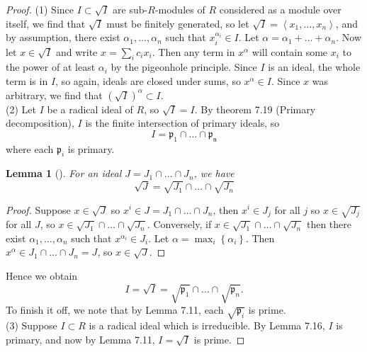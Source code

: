 \documentclass[reqno]{amsart}
\newtheorem{lemma}[theorem]{Lemma}
\theoremstyle{definition}
\theoremstyle{remark}
\begin{document}
    \begin{proof}
        (1) Since $I \subset \sqrt{I} $ are
        sub-$R$-modules of $R$ considered as a module
        over itself, we find that
        $\sqrt{I} $ must be finitely generated, so let
        $\sqrt{I}  = \left< x_1, \ldots, x_n \right>$, and
        by assumption,
        there exist $\alpha_1, \ldots, \alpha_n$ such that
        $x_i^{\alpha_i} \in I$.
        Let $\alpha = \alpha_1 + \ldots
        + \alpha_n$.
        Now let
        $x \in \sqrt{I} $ and write
        $x = \sum_{i} c_i x_i$. Then
        any term in
        $x^{\alpha}$ will contain some
        $x_i$ to the power of at
        least $\alpha_i$ by
        the pigeonhole principle. Since
        $I$ is an ideal, the whole term is in $I$, so
        again, ideals are closed under sums, so
         $x^{\alpha} \in I$.
         Since $x$ was arbitrary, we find
         that
         $\left( \sqrt{I}  \right)^{\alpha}
         \subset I$.\\
         \linebreak
         (2) Let
         $I$ be a radical ideal of $R$, so
         $\sqrt{I}  = I$.
         By theorem 7.19 (Primary decomposition),
         $I$ is the finite intersection
         of primary ideals, so
         \[
         I = \mathfrak{p}_1 \cap \ldots
         \cap \mathfrak{p_n}
         \]
         where each $\mathfrak{p}_i$ is primary.

         \begin{lemma}[]
             For an ideal $J =
             J_1 \cap \ldots \cap J_n$, we have
             \[
             \sqrt{J}  = \sqrt{J_1}  \cap
             \ldots \cap \sqrt{J_n}
             \]
         \end{lemma}
         \begin{proof}
             Suppose
             $x \in \sqrt{J} $ so
             $x^{i} \in J =
             J_1 \cap \ldots \cap J_n$, then
             $x^{i} \in J_j$ for all $j$ so
             $x \in \sqrt{J_j} $ for all $J$, so
             $x \in \sqrt{J_1}  \cap \ldots
             \cap \sqrt{J_n} $.
             Conversely, if
             $x \in \sqrt{J_1} \cap \ldots
             \cap \sqrt{J_n} $ then
             there exist  $\alpha_1, \ldots, \alpha_n$
             such that
             $x^{\alpha_i} \in J_i$.
             Let $\alpha = \max_{i} \left\{ \alpha_i \right\} $.
             Then
             $x^{\alpha} \in
             J_1 \cap \ldots \cap J_n = J$, so
             $x \in \sqrt{J} $.
         \end{proof}
         Hence we obtain
         \[
         I = \sqrt{I}  =
         \sqrt{\mathfrak{p}_1}  \cap
         \ldots \cap
         \sqrt{\mathfrak{p}_n} .
         \]
         To finish it off, we note that
         by Lemma 7.11,
         each $\sqrt{\mathfrak{p}_i} $ is prime.\\
         \linebreak
         (3) Suppose
         $I \subset R$ is a radical ideal which is
         irreducible.
         By Lemma 7.16, $I$ is primary, and now by
         Lemma 7.11,
         $I = \sqrt{I} $ is prime.
    \end{proof}
\end{document}
